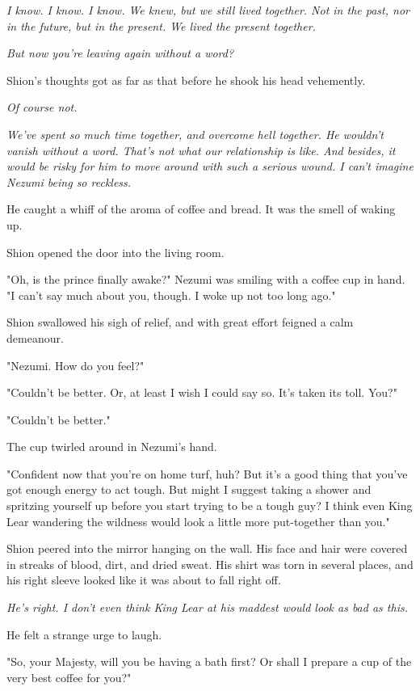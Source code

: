 \emph{I know. I know. I know. We knew, but we still lived together. Not in the
past, nor in the future, but in the present. We lived the present
together.}

\emph{But now you're leaving again without a word?}

Shion's thoughts got as far as that before he shook his head vehemently.

\emph{Of course not.}

\emph{We've spent so much time together, and overcome hell together.
He wouldn't vanish without a word. That's not what our relationship is
like. And besides, it would be risky for him to move around with such a
serious wound. I can't imagine Nezumi being so reckless.}

He caught a whiff of the aroma of coffee and bread. It was the smell of
waking up.

Shion opened the door into the living room.

"Oh, is the prince finally awake?" Nezumi was smiling with a coffee cup
in hand. "I can't say much about you, though. I woke up not too long
ago."

Shion swallowed his sigh of relief, and with great effort feigned a calm
demeanour.

"Nezumi. How do you feel?"

"Couldn't be better. Or, at least I wish I could say so. It's taken its
toll. You?"

"Couldn't be better."

The cup twirled around in Nezumi's hand.

"Confident now that you're on home turf, huh? But it's a good thing that
you've got enough energy to act tough. But might I suggest taking a
shower and spritzing yourself up before you start trying to be a tough
guy? I think even King Lear wandering the wildness would look a little
more put-together than you."

Shion peered into the mirror hanging on the wall. His face and hair were
covered in streaks of blood, dirt, and dried sweat. His shirt was torn
in several places, and his right sleeve looked like it was about to fall
right off.

\emph{He's right. I don't even think King Lear at his maddest would look as
bad as this.}

He felt a strange urge to laugh.

"So, your Majesty, will you be having a bath first? Or shall I prepare a
cup of the very best coffee for you?"

